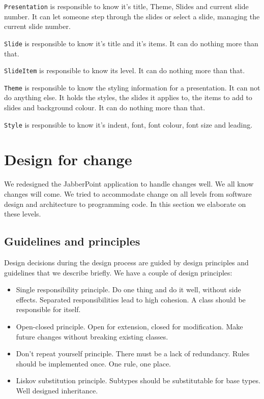 \documentclass[a4paper]{article}
\begin{document}
\texttt{Presentation} is responsible to know it's title, Theme, Slides and current slide number. It can let someone step through the slides or select a slide, managing the current slide number.

\texttt{Slide} is responsible to know it's title and it's items. It can do nothing more than that.

\texttt{SlideItem} is responsible to know its level. It can do nothing more than that. 

\texttt{Theme} is responsible to know the styling information for a presentation. It can not do anything else. It holds the styles, the slides it applies to, the items to add to slides and background colour. It can do nothing more than that.

\texttt{Style} is responsible to know it's indent, font, font colour, font size and leading.

\section{Design for change}
We redesigned the JabberPoint application to handle changes well. We all know changes will come. We tried to accommodate change on all levels from software design and architecture to programming code. In this section we elaborate on these levels.

\subsection{Guidelines and principles} 
Design decisions during the design process are guided by design principles and guidelines that we describe briefly.
We have a couple of design principles:
\begin{itemize}
\item Single responsibility principle. Do one thing and do it well, without side effects. Separated responsibilities lead to high cohesion. A class should be responsible for itself.
\item Open-closed principle. Open for extension, closed for modification. Make future changes without breaking existing classes.
\item Don't repeat yourself principle. There must be a lack of redundancy. Rules should be implemented once. One rule, one place.
\item Liskov substitution principle. Subtypes should be substitutable for base types. Well designed inheritance. 
\end{itemize}
\end{document}

